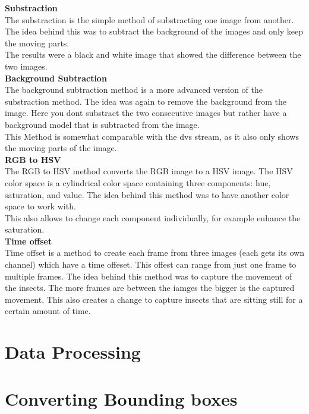\textbf{Substraction} \\
The substraction is the simple method of substracting one image from another. The idea behind this was to subtract the background of the images and only keep the moving parts.\\
The results were a black and white image that showed the difference between the two images.\\

\textbf{Background Subtraction} \\
The background subtraction method is a more advanced version of the substraction method. The idea was again to remove the background from the image. Here you dont substract the two consecutive images but rather have a background model that is subtracted from the image.\\
This Method is somewhat comparable with the dvs stream, as it also only shows the moving parts of the image.\\

\textbf{RGB to HSV} \\
The RGB to HSV method converts the RGB image to a HSV image. The HSV color space is a cylindrical color space containing three components: hue, saturation, and value. The idea behind this method was to have another color space to work with.\\
This also allows to change each component individually, for example enhance the saturation.\\

\textbf{Time offset} \\
Time offset is a method to create each frame from three images (each gets its own channel) which have a time offeset. This offest can range from just one frame to multiple frames. The idea behind this method was to capture the movement of the insects. The more frames are between the iamges the bigger is the captured movement. This also creates a change to capture insects that are sitting still for a certain amount of time.\\

\section{Data Processing}

\section{Converting Bounding boxes} %

